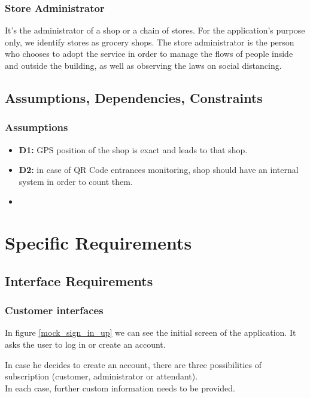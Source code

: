 \documentclass[table, 12pt]{article}
\begin{document}
\subsubsection{Store Administrator}
It's the administrator of a shop or a chain of stores. For the application's purpose only, we identify stores as grocery shops. The store administrator is the person who chooses to adopt the service in order to manage the flows of people inside and outside the building, as well as observing the laws on social distancing.

\subsection{Assumptions, Dependencies, Constraints}
\subsubsection{Assumptions}
\begin{itemize}
    \item \textbf{D1:} GPS position of the shop is exact and leads to that shop.
    \item \textbf{D2:} in case of QR Code entrances monitoring, shop should have an internal system in order to count them.
    \item
\end{itemize}

\newpage
\section{Specific Requirements}
\subsection{Interface Requirements}
\subsubsection{Customer interfaces}
In figure \ref{mock_sign_in_up} we can see the initial screen of the application.
It asks the user to log in or create an account.

In case he decides to create an account, there are three possibilities of subscription (customer, administrator or attendant).\\
In each case, further custom information needs to be provided.
\end{document}

